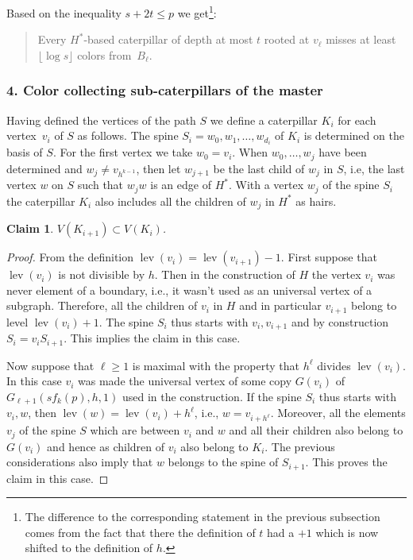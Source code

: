 \documentclass[11pt]{article}
\newtheorem*{klaim}{Claim}
\begin{document}
Based on the inequality $s + 2t \leq p$ we get\footnote{The difference to the
  corresponding statement in the previous subsection comes from the fact that there the
  definition of $t$ had a $+1$ which is now shifted to the definition of
  $h$.}:
\begin{quote}
  Every $H^*$-based caterpillar of depth at most $t$ rooted at $v_\ell$
  misses at least $\lfloor\log s\rfloor$ colors from~$B_\ell$.
\end{quote}

\subsubsection*{4.  Color collecting sub-caterpillars of the master}\hfill

Having defined the vertices of the path $S$ we define a caterpillar $K_i$ for
each vertex~$v_i$ of $S$ as follows. The spine
$S_i =w_0,w_1,\ldots , w_{d_i}$ of $K_i$ is determined on the basis of
$S$. For the first vertex we take $w_0=v_i$. When $w_0 ,\ldots,w_j$ have
been determined and $w_{j}\neq v_{h^{k-1}}$, then let $w_{j+1}$ be the 
last child of $w_j$ in $S$, i.e, the last vertex $w$ on $S$ such
that $w_jw$ is an edge of $H^*$. With a vertex $w_j$ of the spine $S_i$
the caterpillar $K_i$ also includes all the children of $w_j$ in $H^*$
as hairs.

\begin{klaim}
  $V(K_{i+1}) \subset V(K_{i})$.
\end{klaim}

\begin{proof}
  {}From the definition $\operatorname{lev}(v_i) = \operatorname{lev}(v_{i+1})-1$.  First suppose that
  $\operatorname{lev}(v_i)$ is not divisible by $h$.  Then in the construction
  of $H$ the vertex $v_i$ was never element of a boundary, i.e., it wasn't
  used as an universal vertex of a
  subgraph. Therefore, all the children of $v_i$ in $H$ and in particular
  $v_{i+1}$ belong to level $\operatorname{lev}(v_i)+1$.  The spine $S_i$ thus starts with
  $v_i,v_{i+1}$ and by construction $S_i = v_iS_{i+1}$. This implies the claim
  in this case.

  Now suppose that $\ell\geq 1$ is maximal with the property that $h^\ell$
  divides $\operatorname{lev}(v_i)$. In this case $v_i$ was made the universal vertex
  of some copy
  $G(v_i)$ of $G_{\ell+1}(s f_k(p),h,1)$ used in the construction. If the
  spine $S_i$ thus starts with $v_i,w$, then $\operatorname{lev}(w) = \operatorname{lev}(v_i) + h^\ell$,
  i.e., $w = v_{i+h^\ell}$.  Moreover, all the elements $v_j$ of the spine $S$
  which are between $v_i$ and $w$ and all their children also belong to
  $G(v_i)$ and hence as children of $v_i$ also belong to $K_i$.  The previous
  considerations also imply that $w$ belongs to the spine of $S_{i+1}$.  This
  proves the claim in this case.
\end{proof}
\end{document}

